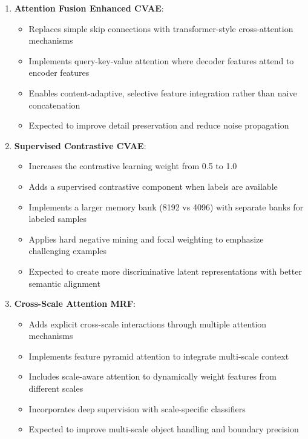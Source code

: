 \documentclass[conference]{IEEEtran}
\begin{document}
\begin{enumerate}
    \item \textbf{Attention Fusion Enhanced CVAE}: 
    \begin{itemize}
        \item Replaces simple skip connections with transformer-style cross-attention mechanisms
        \item Implements query-key-value attention where decoder features attend to encoder features
        \item Enables content-adaptive, selective feature integration rather than naive concatenation
        \item Expected to improve detail preservation and reduce noise propagation
    \end{itemize}
    
    \item \textbf{Supervised Contrastive CVAE}: 
    \begin{itemize}
        \item Increases the contrastive learning weight from 0.5 to 1.0
        \item Adds a supervised contrastive component when labels are available
        \item Implements a larger memory bank (8192 vs 4096) with separate banks for labeled samples
        \item Applies hard negative mining and focal weighting to emphasize challenging examples
        \item Expected to create more discriminative latent representations with better semantic alignment
    \end{itemize}
    
    \item \textbf{Cross-Scale Attention MRF}: 
    \begin{itemize}
        \item Adds explicit cross-scale interactions through multiple attention mechanisms
        \item Implements feature pyramid attention to integrate multi-scale context
        \item Includes scale-aware attention to dynamically weight features from different scales
        \item Incorporates deep supervision with scale-specific classifiers
        \item Expected to improve multi-scale object handling and boundary precision
    \end{itemize}
\end{enumerate}
\end{document}
